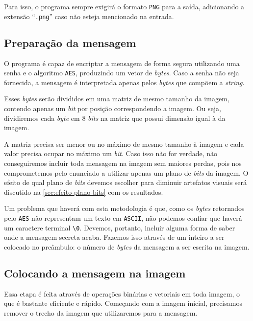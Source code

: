 \documentclass[brazilian,a4paper,twocolumn]{article}
\begin{document}
        Para isso, o programa sempre exigirá o formato \texttt{PNG} para a saída, adicionando a extensão ``\texttt{.png}'' caso não esteja mencionado na entrada.

    \subsection{Preparação da mensagem}
    \label{sec:preparacao-mensagem}

        O programa é capaz de encriptar a mensagem de forma segura utilizando uma senha e o algoritmo \texttt{AES}, produzindo um vetor de \textit{bytes}. Caso a senha não seja fornecida, a mensagem é interpretada apenas pelos \textit{bytes} que compõem a \textit{string}.

        Esses \textit{bytes} serão divididos em uma matriz de mesmo tamanho da imagem, contendo apenas um \textit{bit} por posição correspondendo a imagem. Ou seja, dividiremos cada \textit{byte} em 8 \textit{bits} na matriz que possui dimensão igual à da imagem.

        A matriz precisa ser menor ou no máximo de mesmo tamanho à imagem e cada valor precisa ocupar no máximo um \textit{bit}. Caso isso não for verdade, não conseguiremos incluir toda mensagem na imagem sem maiores perdas, pois nos comprometemos pelo enunciado a utilizar apenas um plano de \textit{bits} da imagem. O efeito de qual plano de \textit{bits} devemos escolher para diminuir artefatos visuais será discutido na \cref{sec:efeito-plano-bits} com os resultados.

        Um problema que haverá com esta metodologia é que, como os \textit{bytes} retornados pelo \texttt{AES} não representam um texto em \texttt{ASCII}, não podemos confiar que haverá um caractere terminal \texttt{\textbackslash0}. Devemos, portanto, incluir alguma forma de saber onde a mensagem secreta acaba. Fazemos isso através de um inteiro a ser colocado no preâmbulo: o número de \textit{bytes} da mensagem a ser escrita na imagem.

    \subsection{Colocando a mensagem na imagem}

        Essa etapa é feita através de operações binárias e vetoriais em toda imagem, o que é bastante eficiente e rápido. Começando com a imagem inicial, precisamos remover o trecho da imagem que utilizaremos para a mensagem.
\end{document}
